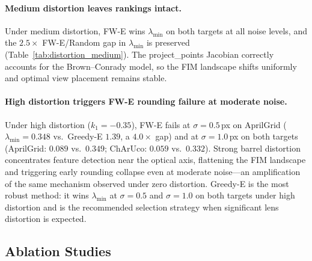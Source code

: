 \documentclass[11pt]{article}
\begin{document}
\paragraph{Medium distortion leaves rankings intact.}
Under medium distortion, FW-E wins $\lambda_{\min}$ on both targets at all
noise levels, and the $2.5{\times}$ FW-E/Random gap in $\lambda_{\min}$ is
preserved (Table~\ref{tab:distortion_medium}).
The project\_points Jacobian correctly accounts for the Brown--Conrady model,
so the FIM landscape shifts uniformly and optimal view placement remains
stable.

\paragraph{High distortion triggers FW-E rounding failure at moderate noise.}
Under high distortion ($k_1{=}{-}0.35$), FW-E fails at $\sigma{=}0.5$\,px on
AprilGrid ($\lambda_{\min}{=}0.348$ vs.\ Greedy-E $1.39$, a $4.0{\times}$ gap)
and at $\sigma{=}1.0$\,px on both targets
(AprilGrid: $0.089$ vs.\ $0.349$; ChArUco: $0.059$ vs.\ $0.332$).
Strong barrel distortion concentrates feature detection near the optical axis,
flattening the FIM landscape and triggering early rounding collapse even at
moderate noise---an amplification of the same mechanism observed under zero
distortion.
Greedy-E is the most robust method: it wins $\lambda_{\min}$ at $\sigma{=}0.5$
and $\sigma{=}1.0$ on both targets under high distortion and is the recommended
selection strategy when significant lens distortion is expected.

\subsection{Ablation Studies}
\label{subsec:ablations}
\end{document}
